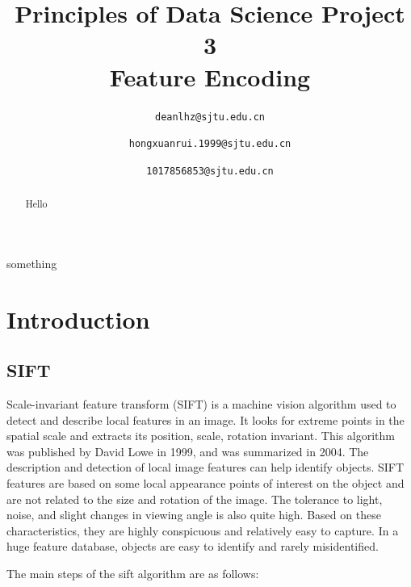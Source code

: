 \documentclass[conference]{IEEEtran}
\begin{document}


\title{Principles of Data Science Project 3\\
Feature Encoding}

\author{
\texttt{deanlhz@sjtu.edu.cn}
\and
{}
\texttt{hongxuanrui.1999@sjtu.edu.cn}
\and
{}
\texttt{1017856853@sjtu.edu.cn}
}

\maketitle

\begin{abstract}
Hello
\end{abstract}

\begin{IEEEkeywords}
something
\end{IEEEkeywords}

\section{Introduction}
\subsection{SIFT}
Scale-invariant feature transform (SIFT) is a machine vision algorithm used to detect and describe local features in an image. It looks for extreme points in the spatial scale and extracts its position, scale, rotation invariant. This algorithm was published by David Lowe in 1999, and was summarized in 2004.\cite{lowe1999object} The description and detection of local image features can help identify objects. SIFT features are based on some local appearance points of interest on the object and are not related to the size and rotation of the image. The tolerance to light, noise, and slight changes in viewing angle is also quite high. Based on these characteristics, they are highly conspicuous and relatively easy to capture. In a huge feature database, objects are easy to identify and rarely misidentified.\par
The main steps of the sift algorithm are as follows:
\end{document}
